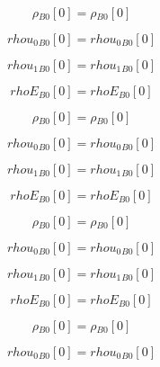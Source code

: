 \documentclass{article}
\begin{document}
\begin{dmath}{\rho{_{B0}}}[{0}] = {\rho{_{B0}}}[{0}]\end{dmath}

\begin{dmath}{rhou_{0}{_{B0}}}[{0}] = {rhou_{0}{_{B0}}}[{0}]\end{dmath}

\begin{dmath}{rhou_{1}{_{B0}}}[{0}] = {rhou_{1}{_{B0}}}[{0}]\end{dmath}

\begin{dmath}{rhoE{_{B0}}}[{0}] = {rhoE{_{B0}}}[{0}]\end{dmath}

\begin{dmath}{\rho{_{B0}}}[{0}] = {\rho{_{B0}}}[{0}]\end{dmath}

\begin{dmath}{rhou_{0}{_{B0}}}[{0}] = {rhou_{0}{_{B0}}}[{0}]\end{dmath}

\begin{dmath}{rhou_{1}{_{B0}}}[{0}] = {rhou_{1}{_{B0}}}[{0}]\end{dmath}

\begin{dmath}{rhoE{_{B0}}}[{0}] = {rhoE{_{B0}}}[{0}]\end{dmath}

\begin{dmath}{\rho{_{B0}}}[{0}] = {\rho{_{B0}}}[{0}]\end{dmath}

\begin{dmath}{rhou_{0}{_{B0}}}[{0}] = {rhou_{0}{_{B0}}}[{0}]\end{dmath}

\begin{dmath}{rhou_{1}{_{B0}}}[{0}] = {rhou_{1}{_{B0}}}[{0}]\end{dmath}

\begin{dmath}{rhoE{_{B0}}}[{0}] = {rhoE{_{B0}}}[{0}]\end{dmath}

\begin{dmath}{\rho{_{B0}}}[{0}] = {\rho{_{B0}}}[{0}]\end{dmath}

\begin{dmath}{rhou_{0}{_{B0}}}[{0}] = {rhou_{0}{_{B0}}}[{0}]\end{dmath}
\end{document}
